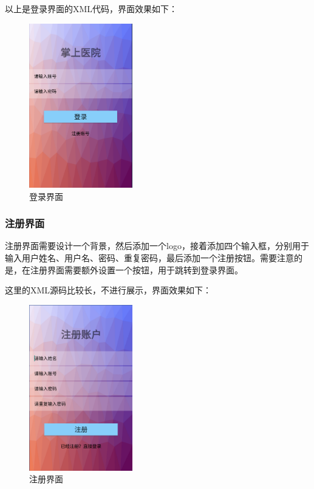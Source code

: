 \documentclass[UTF8,12pt]{article}
\begin{document}
以上是登录界面的XML代码，界面效果如下：

\begin{figure}[htbp]
    \centering
    \includegraphics[width=0.4\textwidth]{imgs/11.png}
    \caption{登录界面}
\end{figure}

\subsubsection{注册界面}
注册界面需要设计一个背景，然后添加一个logo，接着添加四个输入框，分别用于输入用户姓名、用户名、密码、重复密码，最后添加一个注册按钮。需要注意的是，在注册界面需要额外设置一个按钮，用于跳转到登录界面。

这里的XML源码比较长，不进行展示，界面效果如下：

\begin{figure}[htbp]
    \centering
    \includegraphics[width=0.4\textwidth]{imgs/12.png}
    \caption{注册界面}
\end{figure}
\end{document}
